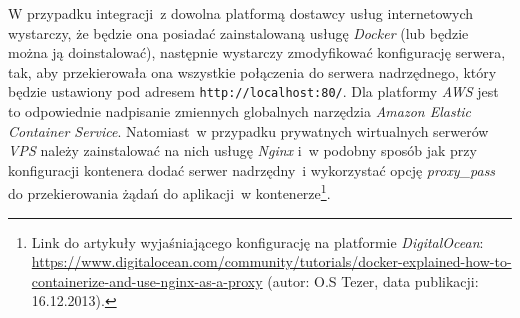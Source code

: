 W przypadku integracji~z dowolna platformą dostawcy usług internetowych wystarczy, że będzie ona posiadać zainstalowaną usługę \textit{Docker} (lub będzie można ją doinstalować), następnie wystarczy zmodyfikować konfigurację serwera, tak, aby przekierowała ona wszystkie połączenia do serwera nadrzędnego, który będzie ustawiony pod adresem \verb|http://localhost:80/|. Dla platformy \textit{AWS} jest to odpowiednie nadpisanie zmiennych globalnych narzędzia \textit{Amazon Elastic Container Service}\cite{aws}. Natomiast~w przypadku prywatnych wirtualnych serwerów \textit{VPS} należy zainstalować na nich usługę \textit{Nginx} i~w podobny sposób jak przy konfiguracji kontenera dodać serwer nadrzędny~i wykorzystać opcję \textit{proxy\_pass} do przekierowania żądań do aplikacji~w kontenerze\footnote{Link do artykuły wyjaśniającego konfigurację na platformie \textit{DigitalOcean}: \url{https://www.digitalocean.com/community/tutorials/docker-explained-how-to-containerize-and-use-nginx-as-a-proxy} (autor: O.S Tezer, data publikacji: 16.12.2013).}.
